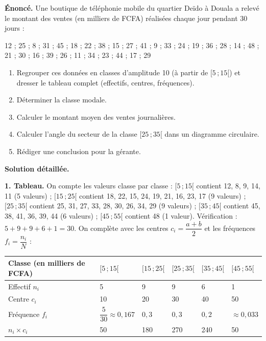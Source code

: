 \documentclass[11pt]{article}
\begin{document}
\begin{exoresolu}
\textbf{Énoncé.} Une boutique de téléphonie mobile du quartier Deïdo à Douala a relevé le montant des ventes (en milliers de FCFA) réalisées chaque jour pendant 30 jours :
\begin{center}
12 ; 25 ; 8 ; 31 ; 45 ; 18 ; 22 ; 38 ; 15 ; 27 ; 41 ; 9 ; 33 ; 24 ; 19 ; 36 ; 28 ; 14 ; 48 ; 21 ; 30 ; 16 ; 39 ; 26 ; 11 ; 34 ; 23 ; 44 ; 17 ; 29
\end{center}
\begin{enumerate}
\item Regrouper ces données en classes d'amplitude 10 (à partir de $[5\,;15[$) et dresser le tableau complet (effectifs, centres, fréquences).
\item Déterminer la classe modale.
\item Calculer le montant moyen des ventes journalières.
\item Calculer l'angle du secteur de la classe $[25\,;35[$ dans un diagramme circulaire.
\item Rédiger une conclusion pour la gérante.
\end{enumerate}
\tcblower
\textbf{Solution détaillée.}

\textbf{1. Tableau.} On compte les valeurs classe par classe : $[5\,;15[$ contient 12, 8, 9, 14, 11 (5 valeurs) ; $[15\,;25[$ contient 18, 22, 15, 24, 19, 21, 16, 23, 17 (9 valeurs) ; $[25\,;35[$ contient 25, 31, 27, 33, 28, 30, 26, 34, 29 (9 valeurs) ; $[35\,;45[$ contient 45, 38, 41, 36, 39, 44 (6 valeurs) ; $[45\,;55[$ contient 48 (1 valeur). Vérification : $5+9+9+6+1=30$. On complète avec les centres $c_i=\dfrac{a+b}{2}$ et les fréquences $f_i=\dfrac{n_i}{N}$ :

\begin{center}
\begin{tabularx}{\linewidth}{|l|X|X|X|X|X|}
\hline
\rowcolor{popblueL} Classe (en milliers de FCFA) & $[5\,;15[$ & $[15\,;25[$ & $[25\,;35[$ & $[35\,;45[$ & $[45\,;55[$ \\
\hline
Effectif $n_i$ & 5 & 9 & 9 & 6 & 1 \\
\hline
Centre $c_i$ & 10 & 20 & 30 & 40 & 50 \\
\hline
Fréquence $f_i$ & $\dfrac{5}{30}\approx 0{,}167$ & $0{,}3$ & $0{,}3$ & $0{,}2$ & $\approx 0{,}033$ \\
\hline
$n_i \times c_i$ & 50 & 180 & 270 & 240 & 50 \\
\hline
\end{tabularx}
\end{center}


\end{exoresolu}
\end{document}

